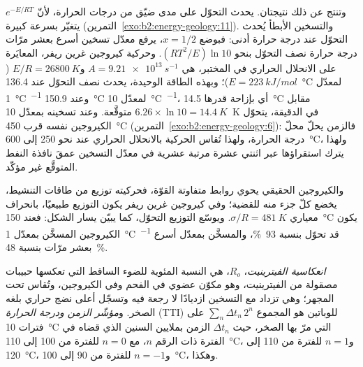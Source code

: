وتنتج عن ذلك نتيجتان. يحدث التحوّل على مدى ضيّق من درجات الحرارة، لأنّ
$e^{-E/RT}$ يتغيّر بسرعة كبيرة (التمرين~\ref{exo:b2:energy-geology:11}). والتسخين الأبطأ يُحدث التحوّل
عند درجة حرارة أدنى: فبوضع $x = 1/2$، يرفع معدّل تسخين أسرع بعشر مرّات درجة حرارة
نصف التحوّل بنحو $(RT^2/E)\ln 10$. وحركية كيروجين غرين ريفر، المعايَرة على
الانحلال الحراري في المختبر، هي $A = \qty{9.21e13}{s^{-1}}$ و$E/R = \qty{26800}{K}$ ($E =
\qty{223}{kJ/mol}$)؛ وبهذه الطاقة الوحيدة، يحدث نصف التحوّل عند \qty{136.4}{\celsius} لمعدّل
\qty{1}{\celsius\per\Myr} وعند \qty{150.9}{\celsius} لمعدّل \qty{10}{\celsius\per\Myr}، أي بإزاحة قدرها
\qty{14.5}{\celsius} مقابل $6.26 \times \ln 10 = \qty{14.4}{K}$ متوقَّعة. وعند تسخينه بمعدّل
\qty{10}{K} في الدقيقة، يتحوّل الكيروجين نفسه قرب \qty{450}{\celsius}
(التمرين~\ref{exo:b2:energy-geology:6}): فالزمن يحلّ محلّ درجة الحرارة، ولهذا تُقاس الحركية
بالانحلال الحراري عند نحو 250 إلى \qty{600}{\celsius}، ولهذا يترك استقراؤها عبر اثنتي عشرة
مرتبة عشرية في معدّل التسخين عمقَ نافذة النفط المتوقَّع غير مؤكّد.

والكيروجين الحقيقي يحوي روابط متفاوتة القوّة، فحركيته توزيع من طاقات
التنشيط، يخضع كلّ جزء منه للقضية؛ وفي كيروجين غرين ريفر يكون التوزيع
طبيعيًا، بانحراف معياري $\sigma/R = \qty{481}{K}$. ويوسّع التوزيع
التحوّل، كما يبيّن يسار الشكل: فعند \qty{150}{\celsius} يكون الكيروجين المسخَّن بمعدّل
\qty{1}{\celsius\per\Myr} قد تحوّل بنسبة \qty{93}{\percent}، والمسخَّن بمعدّل أسرع بعشر مرّات
بنسبة \qty{48}{\percent}.

\begin{definition}\label{def:b2:energy-geology:maturity}
\emph{انعكاسية الفيترينيت}، $R_o$، هي النسبة المئوية للضوء
الساقط التي تعكسها حبيبات مصقولة من الفيترينيت، وهو مكوّن عضوي في الفحم وفي الكيروجين،
وتُقاس تحت المجهر؛ وهي تزداد مع التسخين ازديادًا لا رجعة فيه وتسجّل أعلى نضج حراري بلغه الصخر.
و\emph{مؤشّر الزمن ودرجة الحرارة} (TTI) للوباتين هو المجموع
$\sum_n \Delta t_n\,2^n$ على فترات \qty{10}{\celsius} التي مرّ بها الصخر،
حيث $\Delta t_n$ الزمن بملايين السنين الذي قضاه في الفترة ذات الرقم $n$، مع $n = 0$
للفترة من 100 إلى \qty{110}{\celsius}، و$n = 1$ للفترة من 110 إلى \qty{120}{\celsius}، و$n = -1$ للفترة من 90 إلى
\qty{100}{\celsius}، وهكذا.
\end{definition}

